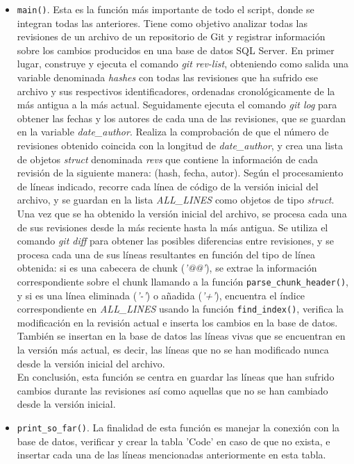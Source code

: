 \documentclass[a4paper, 12pt]{book}
\begin{document}
\begin{itemize}
  \item \texttt{main()}. Esta es la función más importante de todo el script, donde se integran todas las anteriores. Tiene como objetivo analizar todas las revisiones de un archivo de un repositorio de Git y registrar información sobre los cambios producidos en una base de datos SQL Server. En primer lugar, construye y ejecuta
  el comando \textit{git rev-list}, obteniendo como salida una variable denominada \textit{hashes} con todas las revisiones que ha sufrido ese archivo y sus respectivos identificadores, ordenadas cronológicamente de la más antigua a la más actual. Seguidamente ejecuta el comando \textit{git log} para obtener las fechas y los autores
  de cada una de las revisiones, que se guardan en la variable \textit{date\_author}. Realiza la comprobación de que el número de revisiones obtenido coincida con la longitud de \textit{date\_author}, y crea una lista de objetos \textit{struct} denominada \textit{revs} que contiene la información de cada revisión de la siguiente manera:
   (hash, fecha, autor). Según el procesamiento de líneas indicado, recorre cada línea de código de la versión inicial del archivo, y se guardan en la lista \textit{ALL\_LINES} como objetos de tipo \textit{struct}.
   \\Una vez que se ha obtenido la versión inicial del archivo, se procesa cada una de sus revisiones desde la más reciente hasta la más antigua. Se utiliza el comando \textit{git diff} para obtener las posibles diferencias entre revisiones, y se procesa cada una de sus líneas resultantes en función del tipo de línea obtenida: si es una
   cabecera de chunk (\textit{'@@'}), se extrae la información correspondiente sobre el chunk llamando a la función \texttt{parse\_chunk\_header()}, y si es una línea eliminada (\textit{'-'}) o añadida (\textit{'+'}), encuentra el índice correspondiente en \textit{ALL\_LINES} usando la función \texttt{find\_index()}, verifica la modificación
    en la revisión actual e inserta los cambios en la base de datos. También se insertan en la base de datos las líneas vivas que se encuentran en la versión más actual, es decir, las líneas que no se han modificado nunca desde la versión inicial del archivo.
    \\En conclusión, esta función se centra en guardar las líneas que han sufrido cambios durante las revisiones así como aquellas que no se han cambiado desde la versión inicial.

  \item \texttt{print\_so\_far()}. La finalidad de esta función es manejar la conexión con la base de datos, verificar y crear la tabla 'Code' en caso de que no exista, e insertar cada una de las líneas mencionadas anteriormente en esta tabla.
\end{itemize}
\end{document}
